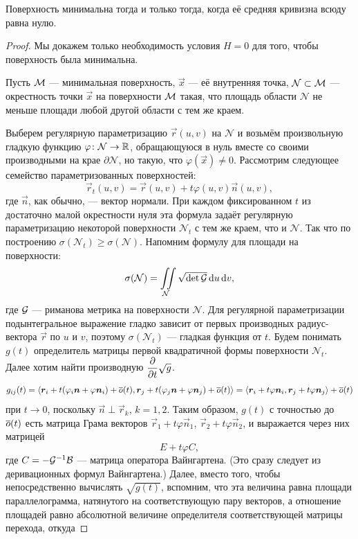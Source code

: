 \begin{theorem}
	Поверхность минимальна тогда и только тогда, когда её средняя кривизна всюду равна нулю.
\end{theorem}

\begin{proof}
	Мы докажем только необходимость условия $H = 0$ для того, чтобы поверхность была минимальна.

	Пусть $\mathcal{M}$ --- минимальная поверхность, $\vec{x}$ --- её внутренняя точка, $\mathcal{N} \subset \mathcal{M}$ --- окрестность точки $\vec{x}$ на поверхности $\mathcal{M}$ такая, что площадь области $\mathcal{N}$ не меньше площади любой другой области с тем же краем.

	Выберем регулярную параметризацию $\vec{r}(u, v)$ на $\mathcal{N}$ и возьмём произвольную гладкую функцию $\varphi\colon \mathcal{N} \to \mathbb{R}$, обращающуюся в нуль вместе со своими производными на крае $\partial\mathcal{N}$, но такую, что $\varphi(\vec{x}) \ne 0$. Рассмотрим следующее семейство параметризованных поверхностей:
	\[
		\vec{r}_t(u, v) = \vec{r}(u, v) + t\varphi(u, v)\vec{n}(u, v),
	\]
	где $\vec{n}$, как обычно, --- вектор нормали. При каждом фиксированном $t$ из достаточно малой окрестности нуля эта формула задаёт регулярную параметризацию некоторой поверхности $\mathcal{N}_t$ с тем же краем, что и $\mathcal{N}$. Так что по построению $\sigma(\mathcal{N}_t) \geqslant \sigma(\mathcal{N})$. Напомним формулу для площади на поверхности:
	\[
		\sigma(\mathcal{N}) = \iint\limits_{\mathcal{N}}\sqrt{\det\mathcal{G}}\mathop{}\!\mathrm{d} u\mathop{}\!\mathrm{d} v,
	\]
	где $\mathcal{G}$ --- риманова метрика на поверхности $\mathcal{N}$. Для регулярной параметризации подынтегральное выражение гладко зависит от первых производных радиус-вектора $\vec{r}$ по $u$ и $v$, поэтому $\sigma(\mathcal{N}_t)$ --- гладкая функция от $t$. Будем понимать $g(t)$ определитель матрицы первой квадратичной формы поверхности $\mathcal{N}_t$. Далее хотим найти производную $\displaystyle\frac{\partial}{\partial t}\sqrt{g}$.
	\[
		g_{ij}(t) = \langle\boldsymbol{r}_i + t(\varphi_i\boldsymbol{n} + \varphi\boldsymbol{n}_i) + \overline{o}(t), \boldsymbol{r}_j + t(\varphi_j\boldsymbol{n} + \varphi\boldsymbol{n}_j) + \overline{o}(t)\rangle = \langle\boldsymbol{r}_i + t\varphi\boldsymbol{n}_i, \boldsymbol{r}_j + t\varphi\boldsymbol{n}_j\rangle + \overline{o}(t)
	\]
	при $t \to 0$, поскольку $\vec{n} \perp \vec{r}_k$, $k = 1, 2$. Таким образом, $g(t)$ с точностью до $\overline{o}(t)$ есть матрица Грама векторов $\vec{r}_1 + t\varphi\vec{n}_1$, $\vec{r}_2 + t\varphi\vec{n}_2$, и выражается через них матрицей
	\[
		E + t\varphi C,
	\]
	где $C = -\mathcal{G}^{-1}\mathcal{B}$ --- матрица оператора Вайнгартена. (Это сразу следует из деривационных формул Вайнгартена.) Далее, вместо того, чтобы непосредственно вычислять $\sqrt{g(t)}$, вспомним, что эта величина равна площади параллелограмма, натянутого на соответствующую пару векторов, а отношение площадей равно абсолютной величине определителя соответствующей матрицы перехода, откуда

\end{proof}
